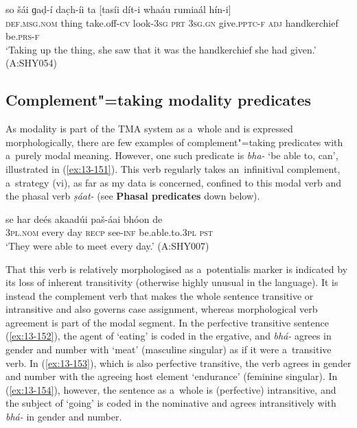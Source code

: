 \begin{exe}
\ex
\label{ex:13-150}
\gll so šái ɡaḍ-í dac̣h-íi ta [tasíi  dít-i whaáu rumiaál hín-i] \\
\textsc{def.msg.nom} thing take.off-\textsc{cv} look-\textsc{3sg} \textsc{prt} \textsc{3sg.gn} give.\textsc{pptc-f} \textsc{adj} handkerchief be.\textsc{prs-f} \\
\glt `Taking up the thing, she saw that it was the handkerchief she had given.' (A:SHY054)
\end{exe}

\subsection{Complement"=taking modality predicates}
\label{subsec:13-5-2}

 As modality is part of the TMA system as a~whole and is expressed morphologically, there are few examples of complement"=taking predicates with a~purely modal meaning. However, one such predicate is \textit{bha-} `be able to, can', illustrated in (\ref{ex:13-151}). This verb regularly takes an~infinitival complement, a~strategy (vi), as far as my data is concerned, confined to this modal verb and the phasal verb \textit{ṣáat-} (see \textbf{Phasal predicates} down below).

\begin{exe}
\ex
\label{ex:13-151}
\gll se har deés akaadúi paš-áai bhóon de  \\
\textsc{3pl.nom} every day \textsc{recp} see-\textsc{inf} be.able.to.\textsc{3pl} \textsc{pst} \\
\glt `They were able to meet every day.' (A:SHY007) 
\end{exe}

That this verb is relatively morphologised as a~potentialis marker is indicated by its loss of inherent transitivity (otherwise highly unusual in the language). It is instead the complement verb that makes the whole sentence transitive or intransitive and also governs case assignment, whereas morphological verb agreement is part of the modal segment. In the perfective transitive sentence (\ref{ex:13-152}), the agent of `eating' is coded in the ergative, and \textit{bhá-} agrees in gender and number with `meat' (masculine singular) as if it were a~transitive verb. In (\ref{ex:13-153}), which is also perfective transitive, the verb agrees in gender and number with the agreeing host element `endurance' (feminine singular). In (\ref{ex:13-154}), however, the sentence as a~whole is (perfective) intransitive, and the subject of `going' is coded in the nominative and agrees intransitively with \textit{bhá-} in gender and number.

